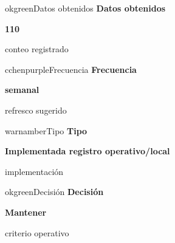 \documentclass[9pt,a4paper]{extarticle}
\begin{document}
\vspace{0.04cm}
\begin{minipage}{0.24\textwidth}
\begin{metricbox}{okgreen}{Datos obtenidos}
{\large\bfseries Datos obtenidos}\par
{\Large\bfseries 110}\par
{\normalsize conteo registrado}
\end{metricbox}
\end{minipage}\hfill
\begin{minipage}{0.24\textwidth}
\begin{metricbox}{cchenpurple}{Frecuencia}
{\large\bfseries Frecuencia}\par
{\large\bfseries semanal}\par
{\normalsize refresco sugerido}
\end{metricbox}
\end{minipage}\hfill
\begin{minipage}{0.24\textwidth}
\begin{metricbox}{warnamber}{Tipo}
{\large\bfseries Tipo}\par
{\normalsize\bfseries Implementada registro operativo/local}\par
{\normalsize implementación}
\end{metricbox}
\end{minipage}\hfill
\begin{minipage}{0.24\textwidth}
\begin{metricbox}{okgreen}{Decisión}
{\large\bfseries Decisión}\par
{\normalsize\bfseries Mantener}\par
{\normalsize criterio operativo}
\end{metricbox}
\end{minipage}
\end{document}
